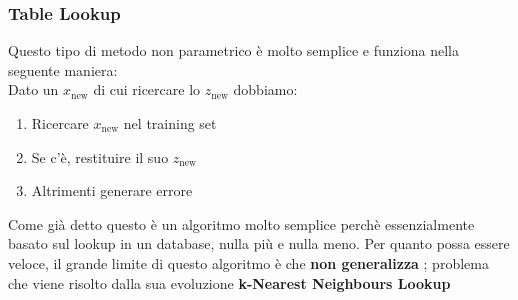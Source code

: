 \subsubsection{Table Lookup}
Questo tipo di metodo non parametrico è molto semplice e funziona nella seguente maniera:\\
Dato un $x_\text{new}$ di cui ricercare lo $z_\text{new}$ dobbiamo:
\begin{enumerate}
    \item Ricercare $x_\text{new}$ nel training set
    \item Se c'è, restituire il suo $z_\text{new}$ 
    \item Altrimenti generare errore
\end{enumerate} 
Come già detto questo è un algoritmo molto semplice perchè essenzialmente basato sul lookup in un database,
nulla più e nulla meno. Per quanto possa essere veloce, il grande limite di questo algoritmo è che \textbf{
    non generalizza
}; problema che viene risolto dalla sua evoluzione \textbf{k-Nearest Neighbours Lookup}


